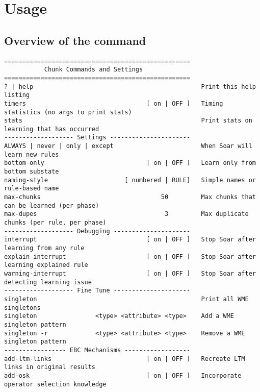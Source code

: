 \section{Usage}
\label{CHUNKING-usage}

\subsection{Overview of the  command}

{\scriptsize
\begin{verbatim}
===================================================
           Chunk Commands and Settings
===================================================
? | help                                              Print this help listing
timers                                 [ on | OFF ]   Timing statistics (no args to print stats)
stats                                                 Print stats on learning that has occurred
------------------- Settings ----------------------
ALWAYS | never | only | except                        When Soar will learn new rules
bottom-only                            [ on | OFF ]   Learn only from bottom substate
naming-style                     [ numbered | RULE]   Simple names or rule-based name
max-chunks                                 50         Max chunks that can be learned (per phase)
max-dupes                                   3         Max duplicate chunks (per rule, per phase)
------------------- Debugging ---------------------
interrupt                              [ on | OFF ]   Stop Soar after learning from any rule
explain-interrupt                      [ on | OFF ]   Stop Soar after learning explained rule
warning-interrupt                      [ on | OFF ]   Stop Soar after detecting learning issue
------------------- Fine Tune ---------------------
singleton                                             Print all WME singletons
singleton                <type> <attribute> <type>    Add a WME singleton pattern
singleton -r             <type> <attribute> <type>    Remove a WME singleton pattern
----------------- EBC Mechanisms ------------------
add-ltm-links                          [ on | OFF ]   Recreate LTM links in original results
add-osk                                [ on | OFF ]   Incorporate operator selection knowledge

\end{verbatim}}
